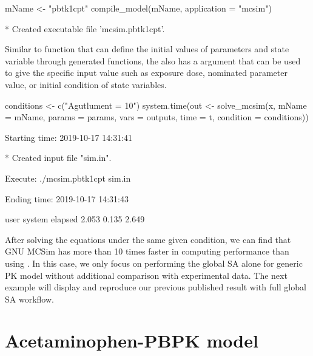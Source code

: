 \begin{Schunk}
\begin{Sinput}
mName <- "pbtk1cpt"
compile_model(mName, application = "mcsim")
\end{Sinput}
\begin{Soutput}
  * Created executable file 'mcsim.pbtk1cpt'.
\end{Soutput}
\end{Schunk}

Similar to  function that can define the initial values
of parameters and state variable through generated functions, the
 also has a  argument that can be
used to give the specific input value such as exposure dose, nominated
parameter value, or initial condition of state variables.

\begin{Schunk}
\begin{Sinput}
conditions <- c("Agutlument = 10") 
system.time(out <- solve_mcsim(x, mName = mName, params = params, 
                               vars = outputs, time = t, 
                               condition = conditions))
\end{Sinput}
\begin{Soutput}
  Starting time: 2019-10-17 14:31:41
\end{Soutput}
\begin{Soutput}
  * Created input file "sim.in".
\end{Soutput}
\begin{Soutput}
  Execute: ./mcsim.pbtk1cpt sim.in
\end{Soutput}
\begin{Soutput}
  Ending time: 2019-10-17 14:31:43
\end{Soutput}
\begin{Soutput}
     user  system elapsed 
    2.053   0.135   2.649
\end{Soutput}
\end{Schunk}

After solving the equations under the same given condition, we can find
that GNU MCSim has more than 10 times faster in computing performance
than using . In this case, we only focus on performing
the global SA alone for generic PK model without additional comparison
with experimental data. The next example will display and reproduce our
previous published result \citep{fphar201800588} with full global SA
workflow.

\hypertarget{acetaminophen-pbpk-model}{%
\section{Acetaminophen-PBPK model}\label{acetaminophen-pbpk-model}}

